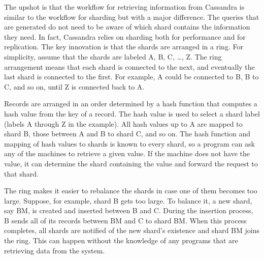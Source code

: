 The upshot is that the workflow for retrieving information from Cassandra
is similar to the workflow for sharding but with a major difference.
The queries that are generated do not need to be aware
of which shard contains the information they need.
In fact, Cassandra relies on sharding both for performance and for replication.
The key innovation is that the shards are arranged in a ring.
For simplicity, assume that the shards are labeled A, B, C, \dots, Z.
The ring arrangement means that each shard is connected to the next,
and eventually the last shard is connected to the first.
For example, A could be connected to B, B to C, and so on, until Z is connected back to A.

Records are arranged in an order determined by a hash function
that computes a hash value from the key of a record.
The hash value is used to select a shard label (labels A through Z in the example).
All hash values up to A are mapped to shard B,
those between A and B to shard C, and so on.
The hash function and mapping of hash values to shards is known to every shard,
so a program can ask any of the machines to retrieve a given value.
If the machine does not have the value,
it can determine the shard containing the value
and forward the request to that shard.

The ring makes it easier to rebalance the shards
in case one of them becomes too large.
Suppose, for example, shard B gets too large.
To balance it, a new shard, say BM, is created and inserted between B and C.
During the insertion process, B sends all of its records between BM and C to shard BM.
When this process completes, all shards are notified of the new
shard's existence and shard BM joins the ring.
This can happen without the knowledge of any programs
that are retrieving data from the system.

